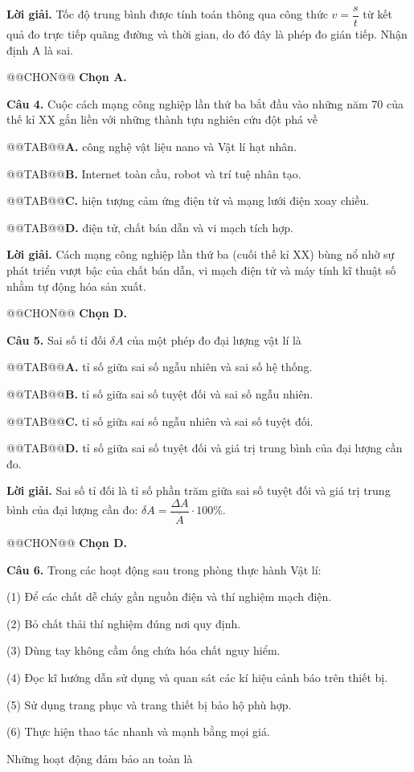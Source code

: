\documentclass{article}
\begin{document}
\textbf{Lời giải.} Tốc độ trung bình được tính toán thông qua công thức $v = \dfrac{s}{t}$ từ kết quả đo trực tiếp quãng đường và thời gian, do đó đây là phép đo gián tiếp. Nhận định A là sai.

@@CHON@@ \textbf{Chọn A.}

\textbf{Câu 4.} Cuộc cách mạng công nghiệp lần thứ ba bắt đầu vào những năm 70 của thế kỉ XX gắn liền với những thành tựu nghiên cứu đột phá về

@@TAB@@\textbf{A.} công nghệ vật liệu nano và Vật lí hạt nhân.

@@TAB@@\textbf{B.} Internet toàn cầu, robot và trí tuệ nhân tạo.

@@TAB@@\textbf{C.} hiện tượng cảm ứng điện từ và mạng lưới điện xoay chiều.

@@TAB@@\textbf{D.} điện tử, chất bán dẫn và vi mạch tích hợp.

\textbf{Lời giải.} Cách mạng công nghiệp lần thứ ba (cuối thế kỉ XX) bùng nổ nhờ sự phát triển vượt bậc của chất bán dẫn, vi mạch điện tử và máy tính kĩ thuật số nhằm tự động hóa sản xuất.

@@CHON@@ \textbf{Chọn D.}

\textbf{Câu 5.} Sai số tỉ đối $\delta A$ của một phép đo đại lượng vật lí là

@@TAB@@\textbf{A.} tỉ số giữa sai số ngẫu nhiên và sai số hệ thống.

@@TAB@@\textbf{B.} tỉ số giữa sai số tuyệt đối và sai số ngẫu nhiên.

@@TAB@@\textbf{C.} tỉ số giữa sai số ngẫu nhiên và sai số tuyệt đối.

@@TAB@@\textbf{D.} tỉ số giữa sai số tuyệt đối và giá trị trung bình của đại lượng cần đo.

\textbf{Lời giải.} Sai số tỉ đối là tỉ số phần trăm giữa sai số tuyệt đối và giá trị trung bình của đại lượng cần đo: $\delta A = \dfrac{\Delta A}{\overline{A}} \cdot 100\%$.

@@CHON@@ \textbf{Chọn D.}

\textbf{Câu 6.} Trong các hoạt động sau trong phòng thực hành Vật lí: \par (1) Để các chất dễ cháy gần nguồn điện và thí nghiệm mạch điện. \par (2) Bỏ chất thải thí nghiệm đúng nơi quy định. \par (3) Dùng tay không cầm ống chứa hóa chất nguy hiểm. \par (4) Đọc kĩ hướng dẫn sử dụng và quan sát các kí hiệu cảnh báo trên thiết bị. \par (5) Sử dụng trang phục và trang thiết bị bảo hộ phù hợp. \par (6) Thực hiện thao tác nhanh và mạnh bằng mọi giá. \par Những hoạt động đảm bảo an toàn là
\end{document}
